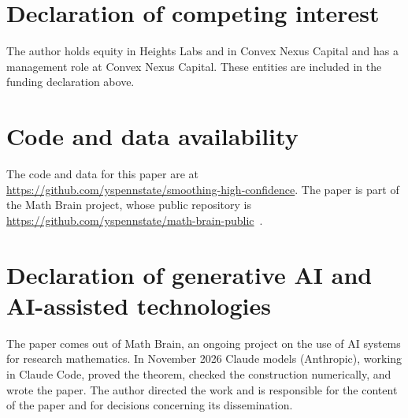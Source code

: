 \documentclass[11pt]{amsart}
\theoremstyle{definition}
\theoremstyle{remark}
\begin{document}
\section*{Declaration of competing interest}
The author holds equity in Heights Labs and in Convex Nexus Capital and has a management role at Convex Nexus
Capital. These entities are included in the funding declaration above.

\section*{Code and data availability}
The code and data for this paper are at \url{https://github.com/yspennstate/smoothing-high-confidence}. The paper is part of the Math Brain project, whose public repository is \url{https://github.com/yspennstate/math-brain-public}~\cite{MathBrainRepo}.

\section*{Declaration of generative AI and AI-assisted technologies}
The paper comes out of Math Brain, an ongoing project on the use of AI systems for research mathematics. In
November 2026 Claude models (Anthropic), working in Claude Code, proved the theorem, checked the construction
numerically, and wrote the paper. The author directed the work and is responsible for the content of the paper
and for decisions concerning its dissemination.
\end{document}
